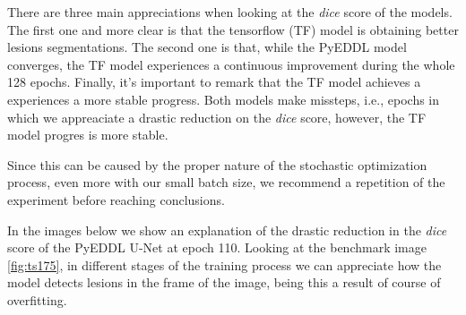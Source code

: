 There are three main appreciations when looking at the \textit{dice} score of the models. The first one and more clear is that the tensorflow (TF) model is obtaining better lesions segmentations. The second one is that, while the PyEDDL model converges, the TF model experiences a continuous improvement during the whole 128 epochs.  Finally, it's important to remark that the TF model achieves a experiences a more stable progress. Both models make missteps, i.e., epochs in which we appreaciate a drastic reduction on the \textit{dice} score, however, the TF model progres is more stable. 


Since this can be caused by the proper nature of the stochastic optimization process, even more with our small batch size, we recommend a repetition of the experiment before reaching conclusions. 

In the images below we show an explanation of the drastic reduction in the \textit{dice} score of the PyEDDL U-Net at epoch 110. Looking at the benchmark image \ref{fig:ts175}, in different stages of the training process we can appreciate how the model detects lesions in the frame of the image, being this a result of course of overfitting.


